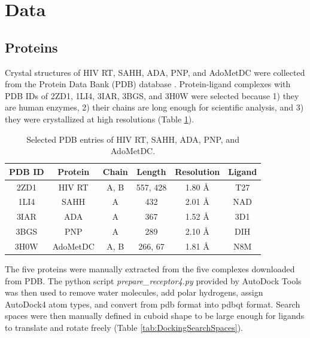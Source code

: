 \section{Data}

\subsection{Proteins}

Crystal structures of HIV RT, SAHH, ADA, PNP, and AdoMetDC were collected from the Protein Data Bank (PDB) database \citep{540-2000,539-2000,537-2003,105-2007,538-2008}. Protein-ligand complexes with PDB IDs of 2ZD1, 1LI4, 3IAR, 3BGS, and 3H0W were selected because 1) they are human enzymes, 2) their chains are long enough for scientific analysis, and 3) they were crystallized at high resolutions (Table \ref{tab:SelectedPDBEntries}).

\begin{table}[h]
\centering
\begin{tabular*}
{\textwidth}
{@{\extracolsep{\fill}}cccccc}
\toprule
PDB ID & Protein & Chain & Length & Resolution & Ligand \\
\midrule
2ZD1 & HIV RT      & A, B & 557, 428 & 1.80 \AA & T27 \\
1LI4   & SAHH       & A     & 432        & 2.01 \AA & NAD \\
3IAR  & ADA         & A     & 367         & 1.52 \AA & 3D1 \\
3BGS  & PNP         & A     & 289         & 2.10 \AA & DIH \\
3H0W & AdoMetDC & A, B & 266, 67   & 1.81 \AA & N8M \\
\bottomrule
\end{tabular*}
\caption{Selected PDB entries of HIV RT, SAHH, ADA, PNP, and AdoMetDC.}
\label{tab:SelectedPDBEntries}
\end{table}

The five proteins were manually extracted from the five complexes downloaded from PDB. The python script \textit{prepare\_receptor4.py} provided by AutoDock Tools \citep{785-1999,596-2009} was then used to remove water molecules, add polar hydrogens, assign AutoDock4 atom types, and convert from pdb format into pdbqt format. Search spaces were then manually defined in cuboid shape to be large enough for ligands to translate and rotate freely (Table \ref{tab:DockingSearchSpaces}).

